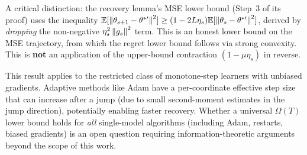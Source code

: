 \begin{remark}
\label{rem:lower-bound-direction}
A critical distinction: the recovery lemma's MSE lower bound
(Step~3 of its proof) uses the inequality
$\mathbb{E}[\left\|\theta_{s+1}-\theta^{*\prime}\right\|^2]
\geq (1-2L\eta_s)\mathbb{E}[\left\|\theta_s-\theta^{*\prime}\right\|^2]$,
derived by \emph{dropping} the non-negative $\eta_s^2\left\|g_s\right\|^2$ term.
This is an honest lower bound on the MSE trajectory, from which
the regret lower bound follows via strong convexity.
This is \textbf{not} an application of the upper-bound contraction
$(1-\mu\eta_s)$ in reverse.
\end{remark}

\begin{remark}
\label{rem:thm1-scope}
This result applies to the restricted class of monotone-step learners
with unbiased gradients.
Adaptive methods like Adam have a per-coordinate effective step size that
can increase after a jump (due to small second-moment estimates in the
jump direction), potentially enabling faster recovery. Whether a universal
$\Omega(T)$ lower bound holds for \emph{all} single-model algorithms
(including Adam, restarts, biased gradients) is an open question requiring
information-theoretic arguments beyond the scope of this work.
\end{remark}
